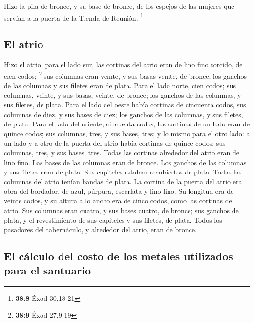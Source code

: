  Hizo la pila de bronce, y su base de bronce, de los
espejos de las mujeres que servían a la puerta de la Tienda de Reunión.
\footnote{\textbf{38:8} Éxod 30,18-21}

\hypertarget{el-atrio}{%
\subsection{El atrio}\label{el-atrio}}

 Hizo el atrio: para el lado sur, las cortinas del atrio
eran de lino fino torcido, de cien codos; \footnote{\textbf{38:9} Éxod
  27,9-19}  sus columnas eran veinte, y sus basas veinte,
de bronce; los ganchos de las columnas y sus filetes eran de plata.
 Para el lado norte, cien codos; sus columnas, veinte, y
sus basas, veinte, de bronce; los ganchos de las columnas, y sus
filetes, de plata.  Para el lado del oeste había cortinas
de cincuenta codos, sus columnas de diez, y sus bases de diez; los
ganchos de las columnas, y sus filetes, de plata.  Para
el lado del oriente, cincuenta codos,  las cortinas de un
lado eran de quince codos; sus columnas, tres, y sus bases, tres;
 y lo mismo para el otro lado: a un lado y a otro de la
puerta del atrio había cortinas de quince codos; sus columnas, tres, y
sus bases, tres.  Todas las cortinas alrededor del atrio
eran de lino fino.  Las bases de las columnas eran de
bronce. Los ganchos de las columnas y sus filetes eran de plata. Sus
capiteles estaban recubiertos de plata. Todas las columnas del atrio
tenían bandas de plata.  La cortina de la puerta del
atrio era obra del bordador, de azul, púrpura, escarlata y lino fino. Su
longitud era de veinte codos, y su altura a lo ancho era de cinco codos,
como las cortinas del atrio.  Sus columnas eran cuatro, y
sus bases cuatro, de bronce; sus ganchos de plata, y el revestimiento de
sus capiteles y sus filetes, de plata.  Todos los
pasadores del tabernáculo, y alrededor del atrio, eran de bronce.

\hypertarget{el-cuxe1lculo-del-costo-de-los-metales-utilizados-para-el-santuario}{%
\subsection{El cálculo del costo de los metales utilizados para el
santuario}\label{el-cuxe1lculo-del-costo-de-los-metales-utilizados-para-el-santuario}}

